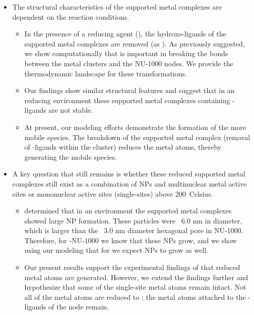 \documentclass[journal=jctcce,manuscript=article]{achemso}
\begin{document}




\begin{itemize}
    \item The structural characteristics of the supported metal complexes are dependent on the reaction conditions.
    \begin{itemize}
        \item In the presence of a reducing agent (), the hydroxo-ligands of the supported metal complexes are removed (as ). As previously suggested, we show computationally that  is important in breaking the bonds between the metal clusters and the NU-1000 nodes. We provide the thermodynamic landscape for these transformations.
        \item Our findings show similar structural features and suggest that in an  reducing environment these supported metal complexes containing -ligands are not stable.  
        \item At present, our modeling efforts demonstrate the formation of the more mobile  species. The breakdown of the supported metal complex (removal of -ligands within the cluster) reduces the metal atoms, thereby generating the mobile  species.
    \end{itemize}
    \item A key question that still remains is whether these reduced supported metal complexes still exist as a combination of NPs and multinuclear metal active sites or mononuclear active sites (single-sites) above \SI{200}{Celsius}.
    \begin{itemize}
        \item \citeauthor{Halder2020} determined that in an  environment the  supported metal complexes showed large  NP formation. These particles were ~6.0 nm in diameter, which is larger than the ~3.0 nm diameter hexagonal pore in NU-1000. Therefore, for -NU-1000 we know that these NPs grow, and we show using our modeling that for  we expect  NPs to grow as well. 
        \item Our present results support the experimental findings of \citeauthor{Halder2020} that reduced metal atoms are generated. However, we extend the findings further and hypothesize that some of the single-site metal atoms remain intact. Not all of the metal atoms are reduced to ; the metal atoms attached to the -ligands of the node remain. 

\end{itemize}
\end{itemize}
\end{document}
